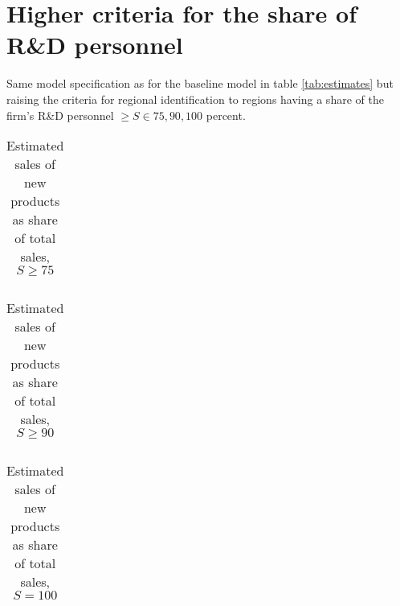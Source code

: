 \section{Higher criteria for the share of R\&D personnel}
\label{app:rob2}
\noindent
Same model specification as for the baseline model in table \ref{tab:estimates} but raising the criteria for regional identification to regions having a share of the firm's R\&D personnel $\geq S\in75,90,100$ percent.
\begin{table}[H]
  \vspace{-.cm}
  \centering
  \caption{Estimated sales of new products as share of total sales, $S\geq75$}
  \footnotesize
    \begin{tabular}{lcc}
    \toprule
        
    \end{tabular}
  \label{tab:rob2.75}
  \vspace{-.5cm}
\end{table}

\begin{table}[H]
  \vspace{-.cm}
  \centering
  \caption{Estimated sales of new products as share of total sales, $S\geq90$}
  \footnotesize
    \begin{tabular}{lcc}
    \toprule
        
    \end{tabular}
  \label{tab:rob2.90}
  \vspace{-.5cm}
\end{table}

\begin{table}[H]
  \vspace{-.cm}
  \centering
  \caption{Estimated sales of new products as share of total sales, $S=100$}
  \footnotesize
    \begin{tabular}{lcc}
    \toprule
        
    \end{tabular}
  \label{tab:rob2.75}
  \vspace{-.5cm}
\end{table}

\clearpage
